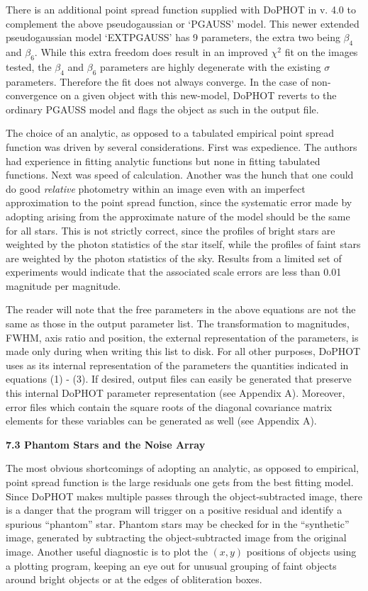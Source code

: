 There is an additional point spread function supplied with
DoPHOT in v. 4.0 to complement the above pseudogaussian 
or `PGAUSS' model.  This newer extended pseudogaussian
model `EXTPGAUSS' has 9 parameters, the extra two
being $\beta_4$  and $\beta_6$.  While this extra freedom 
does result in an improved $\chi^2$ fit on the images tested,
the $\beta_4$  and $\beta_6$ parameters are highly
degenerate with the existing $\sigma$ parameters.  Therefore
the fit does not always converge.  In the case of 
non-convergence on a given object with this new-model, 
DoPHOT reverts to the ordinary PGAUSS model and flags 
the object as such in the output file.

The choice of an analytic, as opposed to a tabulated
empirical point spread function was driven by several
considerations.  First was expedience.  The authors had
experience in fitting analytic functions but none in fitting
tabulated functions.  Next was speed of calculation.
Another was the hunch that one could do good {\it relative}
photometry within an image even with an imperfect
approximation to the point spread function, since the
systematic error made by adopting arising from the
approximate nature of the model should be the same for all
stars.  This is not strictly correct, since the profiles of
bright stars are weighted by the photon statistics of the
star itself, while the profiles of faint stars are weighted
by the photon statistics of the sky.  Results from a limited
set of experiments would indicate that the associated scale
errors are less than 0.01 magnitude per magnitude.

The reader will note that the free parameters in the above
equations are not the same as those in the output parameter
list.  The transformation to magnitudes, FWHM, axis ratio
and position, the external representation of the parameters,
is made only during when writing this list to disk.  For all
other purposes, DoPHOT uses as its internal representation
of the parameters the quantities indicated in equations (1)
- (3).  If desired, output files can easily be generated that
preserve this internal DoPHOT parameter representation (see
Appendix A).  Moreover, error files which contain the square 
roots of the diagonal covariance matrix elements for these 
variables can be generated as well (see
Appendix A).

\centerline{\bf 7.3 Phantom Stars and the Noise Array}

The most obvious shortcomings of adopting an analytic,
as opposed to empirical, point spread function is
the large residuals one gets from the best fitting model.
Since DoPHOT makes multiple passes through the object-subtracted
image, there is a danger that the program will trigger
on a positive residual and identify a spurious ``phantom''
star.  Phantom stars may be checked for in the ``synthetic''
image, generated by subtracting the object-subtracted
image from the original image.  Another useful diagnostic
is to plot the $(x,y)$ positions of objects using a plotting
program, keeping an eye out for unusual grouping of faint
objects around bright objects or at the edges of obliteration boxes.

